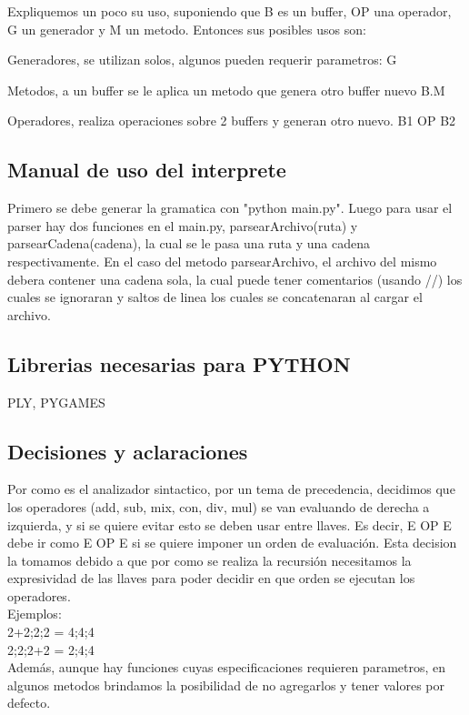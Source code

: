 \documentclass[a4paper,titlepage,10pt]{article}
\begin{document}
Expliquemos un poco su uso, suponiendo que B es un buffer, OP una operador, G un generador y M un metodo. Entonces sus posibles usos son:

Generadores, se utilizan solos, algunos pueden requerir parametros:
G

Metodos, a un buffer se le aplica un metodo que genera otro buffer nuevo
B.M

Operadores, realiza operaciones sobre 2 buffers y generan otro nuevo.
B1 OP B2



\subsection{Manual de uso del interprete}
Primero se debe generar la gramatica con "python main.py". Luego para usar el parser hay dos funciones en el main.py, parsearArchivo(ruta) y parsearCadena(cadena), la cual se le pasa una ruta y una cadena respectivamente.
En el caso del metodo parsearArchivo, el archivo del mismo debera contener una cadena sola, la cual puede tener comentarios (usando //) los cuales se ignoraran y saltos de linea los cuales se concatenaran al cargar el archivo.


\subsection{Librerias necesarias para PYTHON}
PLY, PYGAMES

\subsection{Decisiones y aclaraciones}
Por como es el analizador sintactico, por un tema de precedencia, decidimos que los operadores (add, sub, mix, con, div, mul) se van evaluando de derecha a izquierda, y si se quiere evitar esto se deben usar entre llaves. 
Es decir, E OP E debe ir como {E OP E} si se quiere imponer un orden de evaluación.
Esta decision la tomamos debido a que por como se realiza la recursión necesitamos la expresividad de las llaves para poder decidir en que orden se ejecutan los operadores.\\
Ejemplos: \\
{{2}+{2;2};{2}} = {4;4;4}\\
{{2};{2;2}+{2}} = {2;4;4}\\


Además, aunque hay funciones cuyas especificaciones requieren parametros, en algunos metodos brindamos la posibilidad de no agregarlos y tener valores por defecto.
\end{document}
